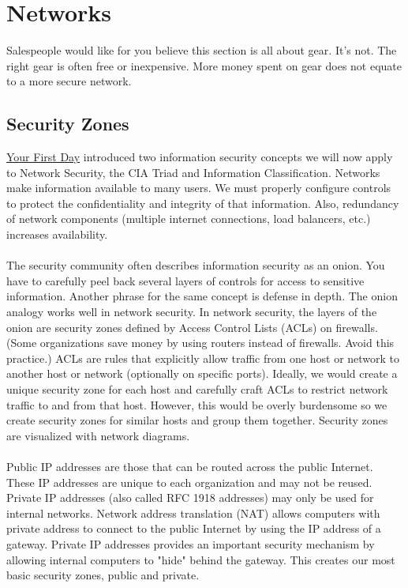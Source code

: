 \section{Networks}\label{sec:"Networks"}
Salespeople would like for you believe this section is all about gear. It's not. The right gear is often free or inexpensive. More money spent on gear does not equate to a more secure network.
\label{subsec:"Security Zones"}\subsection{Security Zones}
\hyperref[sec:"Your First Day"]{Your First Day} introduced two information security concepts we will now apply to Network Security, the CIA Triad and Information Classification. Networks make information available to many users. We must properly configure controls to protect the confidentiality and integrity of that information. Also, redundancy of network components (multiple internet connections, load balancers, etc.) increases availability.\\\\
The security community often describes information security as an onion. You have to carefully peel back several layers of controls for access to sensitive information. Another phrase for the same concept is defense in depth. The onion analogy works well in network security. In network security, the layers of the onion are security zones defined by Access Control Lists (ACLs) on firewalls. (Some organizations save money by using routers instead of firewalls. Avoid this practice.) ACLs are rules that explicitly allow traffic from one host or network to another host or network (optionally on specific ports). Ideally, we would create a unique security zone for each host and carefully craft ACLs to restrict network traffic to and from that host. However, this would be overly burdensome so we create security zones for similar hosts and group them together. Security zones are visualized with network diagrams. \\\\
Public IP addresses are those that can be routed across the public Internet. These IP addresses are unique to each organization and may not be reused. Private IP addresses (also called RFC 1918 addresses) may only be used for internal networks. Network address translation (NAT) allows computers with private address to connect to the public Internet by using the IP address of a gateway. Private IP addresses provides an important security mechanism by allowing internal computers to "hide" behind the gateway. This creates our most basic security zones, public and private. \\\\
